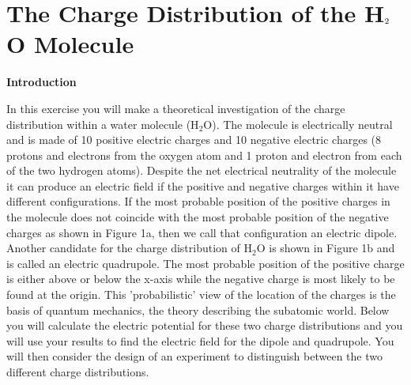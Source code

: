 
\section{The Charge Distribution of the H\protect\( _{2}\protect \)O Molecule}

\makelabheader %

\textbf{Introduction}

In this exercise you will make a theoretical investigation of the
charge distribution within a water molecule (H$_2$O). The molecule
is electrically neutral and is made of 10 positive electric charges
and 10 negative electric charges (8 protons and electrons from the
oxygen atom and 1 proton and electron from each of the two hydrogen
atoms). Despite the net electrical neutrality of the molecule it can
produce an electric field if the positive and negative charges within
it have different configurations. If the most probable position of
the positive charges in the molecule does not coincide with the most
probable position of the negative charges as shown in Figure 1a, then
we call that configuration an electric dipole. Another candidate for
the charge distribution of H$_2$O is shown in Figure 1b and
is called an electric quadrupole. The most probable position of the
positive charge is either above or below the x-axis while the negative
charge is most likely to be found at the origin. This 'probabilistic'
view of the location of the charges is the basis of quantum mechanics,
the theory describing the subatomic world. Below you will calculate
the electric potential for these two charge distributions and you
will use your results to find the electric field for the dipole and
quadrupole. You will then consider the design of an experiment to
distinguish between the two different charge distributions.

